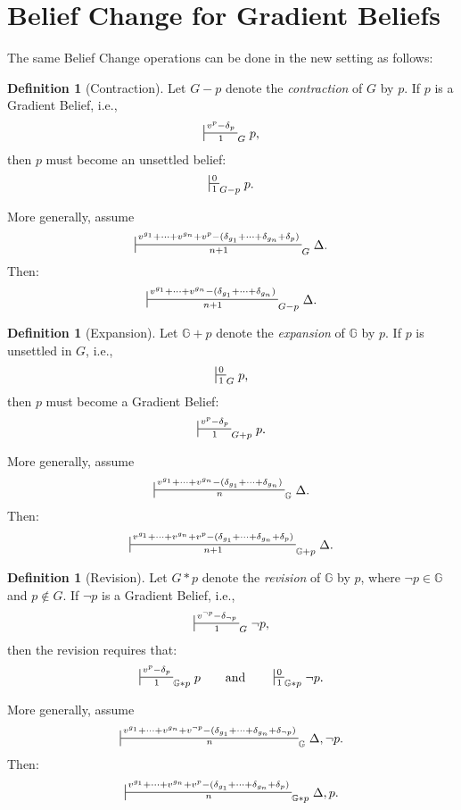 \documentclass[12pt,a4paper,reqno]{amsart}
\theoremstyle{definition}
\newtheorem{definition}[theorem]{Definition}
\newcommand{\numberset}{\mathbb}
\newcommand{\G}{\numberset{G}}
\begin{document}
\section{Belief Change for Gradient Beliefs}

The same Belief Change operations can be done in the new setting as follows: 

\begin{definition}[Contraction]
\label{def:contractionG}
Let $G - p$ denote the \emph{contraction} of $G$ by $p$. If $p$ is a Gradient Belief, i.e., 
\[
\sststile{1}{v^{p} - \delta_p}_{G} p,
\]
then $p$ must become an unsettled belief:
\[
\sststile{1}{0}_{G - p} p.
\]

\noindent
More generally, assume 
\[
\sststile{n+1}{v^{g_1}+\dots+v^{g_n}+v^{p} - (\delta_{g_1} + \dots + \delta_{g_n} + \delta_{p})}_G \Delta.
\] 
Then:
\[
\sststile{n+1}{v^{g_1}+\dots+v^{g_n} - (\delta_{g_1} + \dots + \delta_{g_n})}_{G - p} \Delta.
\]
\end{definition}


\begin{definition}[Expansion]
\label{def:expansionG}
Let $\G + p$ denote the \emph{expansion} of $\G$ by $p$. 
If $p$ is unsettled in $G$, i.e.,
\[
\sststile{1}{0}_{G} p,
\]
then $p$ must become a Gradient Belief:
\[
\sststile{1}{v^{p} - \delta_p}_{G + p} p.
\]

\noindent
More generally, assume
\[
\sststile{n}{v^{g_1}+\dots+v^{g_n} - (\delta_{g_1} + \dots + \delta_{g_n})}_\G \Delta.
\]
Then:
\[
\sststile{n+1}{v^{g_1}+\dots+v^{g_n}+v^{p} - (\delta_{g_1} + \dots + \delta_{g_n} + \delta_{p})}_{\G + p} \Delta.
\]
\end{definition}


\begin{definition}[Revision]
\label{def:revisionG}
Let $G \ast p$ denote the \emph{revision} of $\G$ by $p$, where $\neg p \in \G$ and $p \notin G$. 
If $\neg p$ is a Gradient Belief, i.e.,
\[
\sststile{1}{v^{\neg p} - \delta_{\neg p}}_{G} \neg p,
\]
then the revision requires that:
\[
\sststile{1}{v^{p} - \delta_{p}}_{\G \ast p} p 
\qquad \text{and} \qquad
\sststile{1}{0}_{\G \ast p} \neg p.
\]

\noindent
More generally, assume
\[
\sststile{n}{v^{g_1}+\dots+v^{g_n}+v^{\neg p} - (\delta_{g_1} + \dots + \delta_{g_n} + \delta_{\neg p})}_\G \Delta, \neg p.
\]
Then:
\[
\sststile{n}{v^{g_1}+\dots+v^{g_n}+v^{p} - (\delta_{g_1} + \dots + \delta_{g_n} + \delta_{p})}_{\G \ast p} \Delta, p.
\]
\end{definition}
\end{document}

